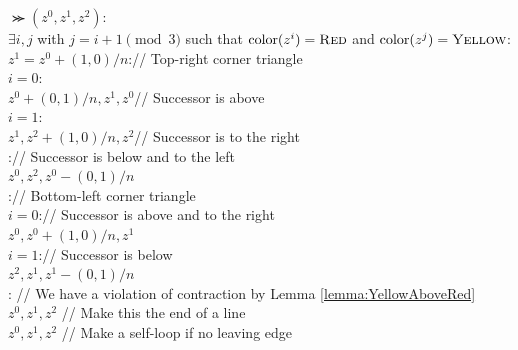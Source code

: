   \begin{algo}
    $\Succ(z^0,z^1,z^2)$:\+
    \\ \IfB $\exists i,j$ with $j = i + 1 \pmod{3}$ such that $\operatorname{color}(z^i) = \textsc{Red}$ and $\operatorname{color}(z^j) = \textsc{Yellow}$:\+
    \\   \IfB $z^1 = z^0 + (1,0)/n$:\quad // Top-right corner triangle\+    
    \\     \IfB $i = 0$:\+
    \\       \ReturnB $z^0+(0,1)/n,z^1,z^0$\quad // Successor is above\-
    \\     \ElseIfB $i = 1$:\+
    \\       \ReturnB $z^1,z^2 + (1,0)/n,z^2$// Successor is to the right\-
    \\     \ElseB:\quad // Successor is below and to the left\+
    \\       \ReturnB $z^0,z^2,z^0 - (0,1)/n$\-\-
    \\   \ElseB:\quad // Bottom-left corner triangle\+
    \\     \IfB $i = 0$:\quad // Successor is above and to the right\+
    \\       \ReturnB $z^0,z^0+(1,0)/n,z^1$\-
    \\     \ElseIfB $i = 1$:\quad // Successor is below\+
    \\       \ReturnB $z^2,z^1,z^1-(0,1)/n$\-
    \\     \ElseB: \quad// We have a violation of contraction by Lemma \ref{lemma:YellowAboveRed}\+
    \\       \ReturnB $z^0,z^1,z^2$ \quad// Make this the end of a line\-\-\-
    \\ \ReturnB $z^0,z^1,z^2$ \quad// Make a self-loop if no leaving edge
  \end{algo}
    
